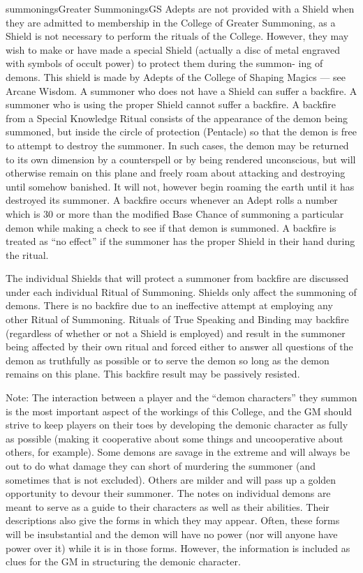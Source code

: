 \begin{College}[1.0]{summonings}{Greater Summonings}{GS}
Adepts are not provided with a Shield when they are admitted to
membership in the College of Greater Summoning, as a Shield is not
necessary to perform the rituals of the College.  However, they may
wish to make or have made a special Shield (actually a disc of metal
engraved with symbols of occult power) to protect them during the
summon- ing of demons.  This shield is made by Adepts of the College
of Shaping Magics — see Arcane Wisdom. A summoner who does not have a
Shield can suffer a backfire.  A summoner who is using the proper
Shield cannot suffer a backfire.  A backfire from a Special Knowledge
Ritual consists of the appearance of the demon being summoned, but
inside the circle of protection (Pentacle) so that the demon is free
to attempt to destroy the summoner.  In such cases, the demon may be
returned to its own dimension by a counterspell or by being rendered
unconscious, but will otherwise remain on this plane and freely roam
about attacking and destroying until somehow banished.  It will not,
however begin roaming the earth until it has destroyed its summoner. A
backfire occurs whenever an Adept rolls a number which is 30 or more
than the modified Base Chance of summoning a particular demon while
making a check to see if that demon is summoned.  A backfire is
treated as “no effect” if the summoner has the proper Shield in their
hand during the ritual.

The individual Shields that will protect a summoner from backfire are
discussed under each individual Ritual of Summoning.  Shields only
affect the summoning of demons. There is no backfire due to an
ineffective attempt at employing any other Ritual of Summoning.
Rituals of True Speaking and Binding may backfire (regardless of
whether or not a Shield is employed) and result in the summoner being
affected by their own ritual and forced either to answer all questions
of the demon as truthfully as possible or to serve the demon so long
as the demon remains on this plane.  This backfire result may be
passively resisted.

Note: The interaction between a player and the “demon characters” they
summon is the most important aspect of the workings of this College,
and the GM should strive to keep players on their toes by developing
the demonic character as fully as possible (making it cooperative
about some things and uncooperative about others, for example).  Some
demons are savage in the extreme and will always be out to do what
damage they can short of murdering the summoner (and sometimes that is
not excluded). Others are milder and will pass up a golden opportunity
to devour their summoner. The notes on individual demons are meant to
serve as a guide to their characters as well as their abilities.
Their descriptions also give the forms in which they may appear.
Often, these forms will be insubstantial and the demon will have no
power (nor will anyone have power over it) while it is in those forms.
However, the information is included as clues for the GM in
structuring the demonic character.


\end{College}
